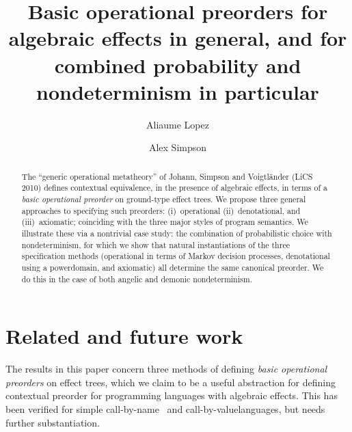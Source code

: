 \documentclass[a4paper,UKenglish]{lipics-v2018}
\title{Basic operational preorders  for algebraic effects in general, and for
combined probability and nondeterminism in particular}
\author{Aliaume Lopez}{\'Ecole Normale Sup\'erieure Paris-Saclay\\{Universit\'e Paris-Saclay, France}}{aliaume.lopez@ens-paris-saclay.fr}{}{}%
\author{Alex Simpson}{Faculty of Mathematics and Physics\\{University of Ljubljana, Slovenia}}{Alex.Simpson@fmf.uni-lj.si}{}{}
\theoremstyle{plain}
\begin{document}
\maketitle

\begin{abstract}
The ``generic operational metatheory'' of  Johann, Simpson and Voigtl\"{a}nder (LiCS 2010) defines
contextual equivalence, 
in the presence of algebraic effects, in terms of a
\emph{basic operational preorder} on ground-type effect trees. We propose three general approaches to 
specifying such preorders: (i)~operational (ii)~denotational, and (iii)~axiomatic; coinciding with the three major styles of program semantics. We illustrate these via a nontrivial case study: the combination of probabilistic choice with nondeterminism, for which we show that  natural instantiations of the three specification methods (operational in terms of Markov decision processes, denotational using  a powerdomain, and axiomatic) all determine the same canonical preorder. We do this in the case of both angelic and demonic nondeterminism. 
 \end{abstract}

















\section{Related and future work}
\label{section:conclusions}

The results in this paper concern three methods of defining \emph{basic operational preorders} on effect trees, which we claim to be a useful abstraction for defining contextual preorder for programming languages with algebraic effects. This has been verified for simple call-by-name~\cite{gom} and call-by-value\footnotemark[3] languages, but needs further substantiation.
\end{document}
